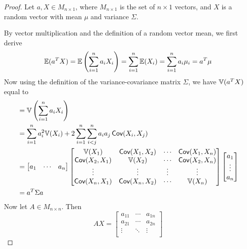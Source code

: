\documentclass[a4paper]{article}
\begin{document}
\begin{proof}[Proof] 
Let \(a, X \in M_{n \times 1}\), where \(M_{n \times 1}\) is the set of \(n \times 1\) vectors, and \(X\) is a random vector with mean \(\mu \) and variance \(\Sigma\).

By vector multiplication and the definition of a random vector mean, we first derive
\[
	\mathbb{E}(a^{T}X) = \mathbb{E} \left( \sum_{i=1}^{n} a_{i} X_{i} \right)  = \sum_{i=1}^{n} \mathbb{E}(X_{i}) = \sum_{i=1}^{n} a_{i} \mu_{i} = a^{T}\mu 
\]
Now using the definition of the variance-covariance matrix \(\Sigma\), we have \(\mathbb{V}(a^{T}X)\) equal to
\begin{align*}
	 & = \mathbb{V} \left( \sum_{i=1}^{n} a_{i} X_{i} \right)  \\
	 & = \sum_{i=1}^{n} a_{i}^{2} \mathbb{V}(X_{i}) + 2 \sum_{i=1}^{n} \sum_{i < j}^{n} a_{i} a_{j} \operatorname{\textsf{Cov}}(X_{i}, X_{j}) \\ 
	 & = \begin{bmatrix}
		a_{1} & \cdots & a_{n} \\
	\end{bmatrix}
	 \begin{bmatrix}
		\mathbb{V}(X_{1}) & \operatorname{\textsf{Cov}}(X_{1}, X_{2}) & \cdots & \operatorname{\textsf{Cov}}(X_{1}, X_{n})  \\
		\operatorname{\textsf{Cov}}(X_{2}, X_{1}) & \mathbb{V}(X_{2}) & \cdots & \operatorname{\textsf{Cov}}(X_{2}, X_{n}) \\
		\vdots  & \vdots & \vdots & \vdots \\
		 \operatorname{\textsf{Cov}}(X_{n}, X_{1}) & \operatorname{\textsf{Cov}}(X_{n}, X_{2}) & \cdots & \mathbb{V}(X_{n}) \\
	\end{bmatrix}
	\begin{bmatrix}
		a_{1} \\
		\vdots \\
		a_{n} \\
	\end{bmatrix} \\
	 & = a^{T} \Sigma a
\end{align*}
Now let \(A \in M_{n \times n}\). Then
\[
	AX = 
	\begin{bmatrix}
		a_{11} & \cdots  & a_{1n} \\
		a_{21} & \cdots  & a_{2n} \\
		\vdots & \ddots & \vdots \\

\end{bmatrix}\]
\end{proof}
\end{document}
